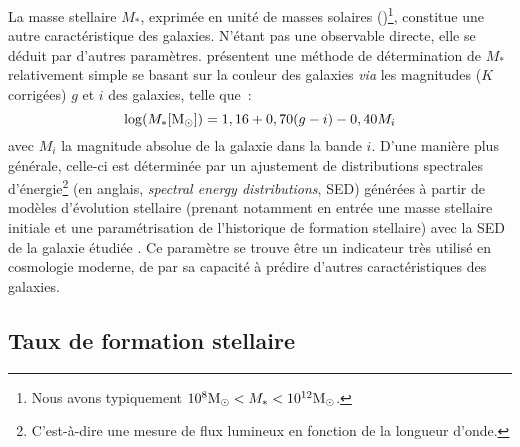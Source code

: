 \documentclass[../main/main.tex]{subfiles}
\begin{document}
La masse stellaire $M_*$, exprimée en unité de masses solaires
(\si{\Msun})\footnote{Nous avons typiquement $10^{8}\si{\Msun} < M_* <
10^{12}\si{\Msun}$.}, constitue une autre caractéristique des galaxies. N'étant
pas une observable directe, elle se déduit par d'autres paramètres.
\cite{taylor2011} présentent une méthode de détermination de $M_*$ relativement
simple se basant sur la couleur des galaxies \textit{via} les magnitudes ($K$
corrigées) $g$ et $i$ des galaxies, telle que~:
\begin{equation}\label{eq:taylor}
    \log(M_* [\si{\Msun}]) = 1,16 + 0,70(g-i) -0,40 M_i
\end{equation}
avec $M_i$ la magnitude absolue de la galaxie dans la bande $i$. D'une manière
plus générale, celle-ci est déterminée par un ajustement de distributions
spectrales d'énergie\footnote{C'est-à-dire une mesure de flux lumineux en
fonction de la longueur d'onde.} (en anglais, \textit{spectral energy
distributions}, SED) générées à partir de modèles d'évolution stellaire (prenant
notamment en entrée une masse stellaire initiale et une paramétrisation de
l'historique de formation stellaire) avec la SED de la galaxie étudiée
\citep{walcher2011}. Ce paramètre se trouve être un indicateur très utilisé en
cosmologie moderne, de par sa capacité à prédire d'autres caractéristiques des
galaxies.


\subsection{Taux de formation stellaire}\label{ssec:sfrhost}
\end{document}
